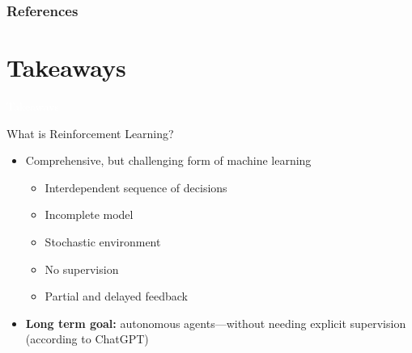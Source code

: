 \documentclass[11pt,table]{beamer}
\begin{document}
%
%
%
%
%
%
%

\begin{frame}[t,allowframebreaks
]\nocite{*}
\frametitle{References}
\small

\end{frame}


\section{Takeaways}
{
\begin{frame}
\centering
\Huge
\textcolor{white}{Takeaways}
\thispagestyle{empty}
\end{frame}
}

\begin{frame}{What is Reinforcement Learning?}

\begin{itemize}
\item  Comprehensive, but challenging form of machine learning
\begin{itemize}
\item Interdependent sequence of decisions
\item Incomplete model
\item Stochastic environment
\item No supervision
\item Partial and delayed feedback 
 
\end{itemize}
\item  \textbf{Long term goal:} autonomous agents---without needing explicit supervision (according to ChatGPT)

    \end{itemize}
\end{frame}
\end{document}
